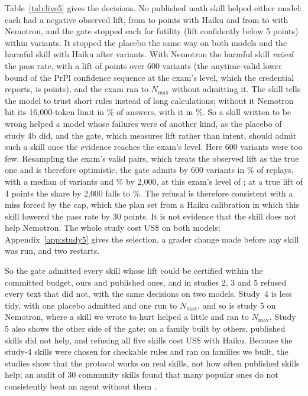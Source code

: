 Table~\ref{tab:live5} gives the decisions. No published math skill helped either model: each had a negative observed lift, from \NLsFiveHelpLift{} to \NLsFiveSkillLift{} points with Haiku and from \NLnFiveHelpLift{} to \NLnFiveSkillLift{} with Nemotron, and the gate stopped each for futility (lift confidently below 5 points) within \NLsFiveHelpN{} variants. It stopped the placebo the same way on both models and the harmful skill with Haiku after \NLsFiveHarmN{} variants. With Nemotron the harmful skill \emph{raised} the pass rate, with a lift of \NLnFiveHarmLift{} points over 600 variants (the anytime-valid lower bound of the PrPl confidence sequence at the exam's level, which the credential reports, is \NLnFiveHarmLcb{} points), and the exam ran to $N_{\max}$ without admitting it. The skill tells the model to trust short rules instead of long calculations; without it Nemotron hit its 16{,}000-token limit in \NLnFiveHarmCutPctWithout\% of answers, with it in \NLnFiveHarmCutPctWith\%. So a skill written to be wrong helped a model whose failures were of another kind, as the placebo of study 4b did, and the gate, which measures lift rather than intent, should admit such a skill once the evidence reaches the exam's level. Here 600 variants were too few. Resampling the exam's \NLnFiveHarmValid{} valid pairs, which treats the observed lift as the true one and is therefore optimistic, the gate admits by 600 variants in \NLnFiveHarmBootSix\% of replays, with a median of \NLnFiveHarmBootMed{} variants and \NLnFiveHarmBootTwoK\% by 2{,}000, at this exam's level of \NLnFiveHarmLevel; at a true lift of 4 points the share by 2{,}000 falls to \NLnFiveHarmFourTwoK\%. The refusal is therefore consistent with a miss forced by the cap, which the plan set from a Haiku calibration in which this skill lowered the pass rate by 30 points. It is not evidence that the skill does not help Nemotron. The whole study cost US\$\NLFiveTotalCost{} on both models; Appendix~\ref{app:study5} gives the selection, a grader change made before any skill was run, and two restarts.

So the gate admitted every skill whose lift could be certified within the committed budget, ours and published ones, and in studies 2, 3 and 5 refused every text that did not, with the same decisions on two models. Study~4 is less tidy, with one placebo admitted and one run to $N_{\max}$, and so is study 5 on Nemotron, where a skill we wrote to hurt helped a little and ran to $N_{\max}$. Study 5 also shows the other side of the gate: on a family built by others, published skills did not help, and refusing all five skills cost US\$\NLsFiveCost{} with Haiku. Because the study-4 skills were chosen for checkable rules and ran on families we built, the studies show that the protocol works on real skills, not how often published skills help; an audit of 30 community skills found that many popular ones do not consistently beat an agent without them \citep{ying2026openskilleval}.
